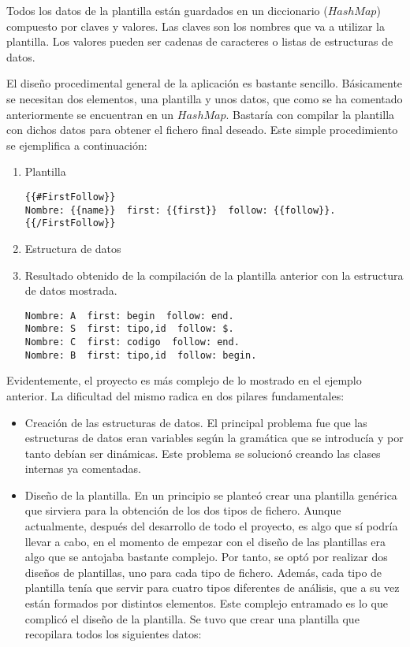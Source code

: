 Todos los datos de la plantilla están guardados en un diccionario ($HashMap$) compuesto por claves y valores. Las claves son los nombres que va a utilizar la plantilla.
Los valores pueden ser cadenas de caracteres o listas de estructuras de datos.

El diseño procedimental general de la aplicación es bastante sencillo. Básicamente se necesitan dos elementos, una plantilla y unos datos, que como se ha comentado anteriormente se encuentran en un $HashMap$. Bastaría con compilar la plantilla con dichos datos para obtener el fichero final deseado. Este simple procedimiento se ejemplifica a continuación:

\begin{enumerate}
\item Plantilla
\begin{verbatim}
{{#FirstFollow}}
Nombre: {{name}}  first: {{first}}  follow: {{follow}}.
{{/FirstFollow}}
\end{verbatim}
\item Estructura de datos
\item Resultado obtenido de la compilación de la plantilla anterior con la estructura de datos mostrada.
\begin{verbatim}
Nombre: A  first: begin  follow: end.
Nombre: S  first: tipo,id  follow: $.
Nombre: C  first: codigo  follow: end.
Nombre: B  first: tipo,id  follow: begin.
\end{verbatim}
\end{enumerate}

Evidentemente, el proyecto es más complejo de lo mostrado en el ejemplo anterior. La dificultad del mismo radica en dos pilares fundamentales:

\begin{itemize}
\item Creación de las estructuras de datos. El principal problema fue que las estructuras de datos eran variables según la gramática que se introducía y por tanto debían ser dinámicas. Este problema se solucionó creando las clases internas ya comentadas.
\item Diseño de la plantilla. En un principio se planteó crear una plantilla genérica que sirviera para la obtención de los dos tipos de fichero. Aunque actualmente, después del desarrollo de todo el proyecto, es algo que sí podría llevar a cabo, en el momento de empezar con el diseño de las plantillas era algo que se antojaba bastante complejo. Por tanto, se optó por realizar dos diseños de plantillas, uno para cada tipo de fichero. Además, cada tipo de plantilla tenía que servir para cuatro tipos diferentes de análisis, que a su vez están formados por distintos elementos. Este complejo entramado es lo que complicó el diseño de la plantilla. Se tuvo que crear una plantilla que recopilara todos los siguientes datos:

\end{itemize} 

